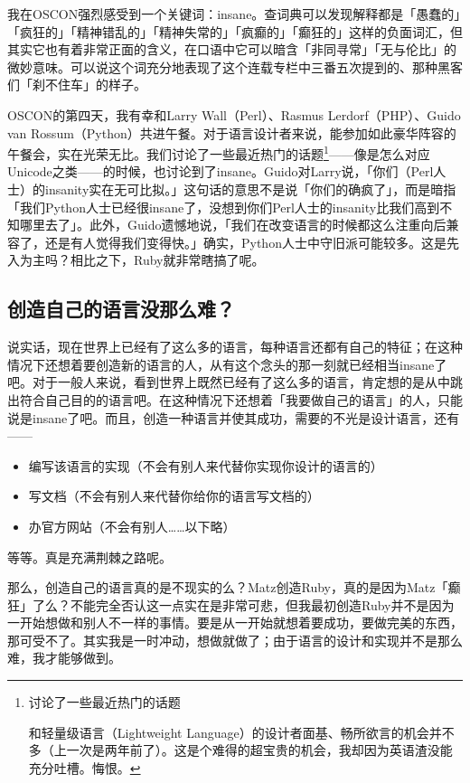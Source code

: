 \documentclass[a4paper,12pt]{article}
\begin{document}
我在OSCON强烈感受到一个关键词：insane。查词典可以发现解释都是「愚蠢的」「疯狂的」「精神错乱的」「精神失常的」「疯癫的」「癫狂的」这样的负面词汇，但其实它也有着非常正面的含义，在口语中它可以暗含「非同寻常」「无与伦比」的微妙意味。可以说这个词充分地表现了这个连载专栏中三番五次提到的、那种黑客们「刹不住车」的样子。

OSCON的第四天，我有幸和Larry Wall（Perl）、Rasmus Lerdorf（PHP）、Guido van Rossum（Python）共进午餐。对于语言设计者来说，能参加如此豪华阵容的午餐会，实在光荣无比。我们讨论了一些最近热门的话题\footnote{讨论了一些最近热门的话题

和轻量级语言（Lightweight Language）的设计者面基、畅所欲言的机会并不多（上一次是两年前了）。这是个难得的超宝贵的机会，我却因为英语渣没能充分吐槽。悔恨。}——像是怎么对应Unicode之类——的时候，也讨论到了insane。Guido对Larry说，「你们（Perl人士）的insanity实在无可比拟。」这句话的意思不是说「你们的确疯了」，而是暗指「我们Python人士已经很insane了，没想到你们Perl人士的insanity比我们高到不知哪里去了」。此外，Guido遗憾地说，「我们在改变语言的时候都这么注重向后兼容了，还是有人觉得我们变得快。」确实，Python人士中守旧派可能较多。这是先入为主吗？相比之下，Ruby就非常瞎搞了呢。

\subsection{创造自己的语言没那么难？}

说实话，现在世界上已经有了这么多的语言，每种语言还都有自己的特征；在这种情况下还想着要创造新的语言的人，从有这个念头的那一刻就已经相当insane了吧。对于一般人来说，看到世界上既然已经有了这么多的语言，肯定想的是从中跳出符合自己目的的语言吧。在这种情况下还想着「我要做自己的语言」的人，只能说是insane了吧。而且，创造一种语言并使其成功，需要的不光是设计语言，还有——
\begin{itemize}
\item 编写该语言的实现（不会有别人来代替你实现你设计的语言的）
\item 写文档（不会有别人来代替你给你的语言写文档的）
\item 办官方网站（不会有别人……以下略）
\end{itemize}
等等。真是充满荆棘之路呢。

那么，创造自己的语言真的是不现实的么？Matz创造Ruby，真的是因为Matz「癫狂」了么？不能完全否认这一点实在是非常可悲，但我最初创造Ruby并不是因为一开始想做和别人不一样的事情。要是从一开始就想着要成功，要做完美的东西，那可受不了。其实我是一时冲动，想做就做了；由于语言的设计和实现并不是那么难，我才能够做到。
\end{document}
